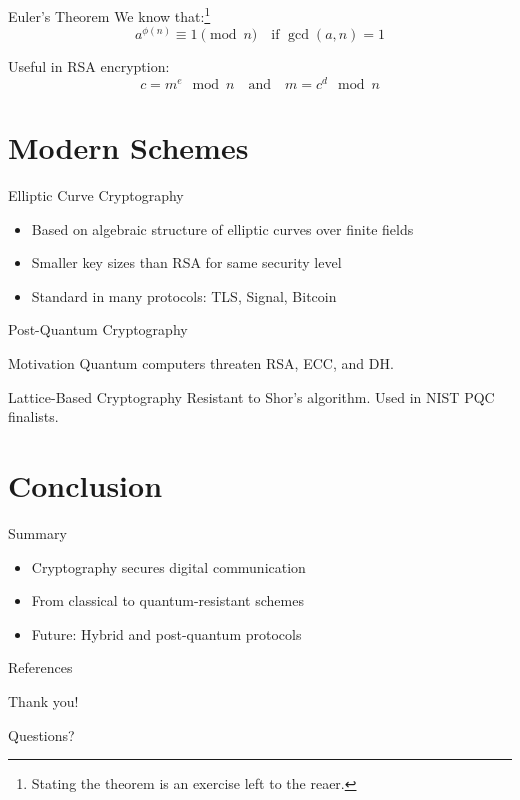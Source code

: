 \documentclass{beamer}
\begin{document}
\begin{frame}{Euler’s Theorem}
We know that:\footnote{Stating the theorem is an exercise left to the reaer.}
\[
a^{\phi(n)} \equiv 1 \pmod{n} \quad \text{if } \gcd(a,n)=1
\]

\pause

Useful in RSA encryption:
\[
c = m^e \mod n \quad\text{and}\quad m = c^d \mod n
\]
\end{frame}

\section{Modern Schemes}

\begin{frame}{Elliptic Curve Cryptography}
\begin{itemize}
\item Based on algebraic structure of elliptic curves over finite fields
\item Smaller key sizes than RSA for same security level
\item Standard in many protocols: TLS, Signal, Bitcoin
\end{itemize}
\end{frame}

\begin{frame}{Post-Quantum Cryptography}
\begin{alertblock}{Motivation}
Quantum computers threaten RSA, ECC, and DH.
\end{alertblock}

\begin{exampleblock}{Lattice-Based Cryptography}
Resistant to Shor's algorithm. Used in NIST PQC finalists.
\end{exampleblock}
\end{frame}

\section{Conclusion}

\begin{frame}{Summary}
\begin{itemize}
\item Cryptography secures digital communication
\item From classical to quantum-resistant schemes
\item Future: Hybrid and post-quantum protocols
\end{itemize}
\end{frame}

\begin{frame}[allowframebreaks]{References}
  \printbibliography
\end{frame}

\begin{frame}{Thank you!}
\begin{center}
Questions?

\vspace{2em}
\end{center}
\end{frame}
\end{document}

